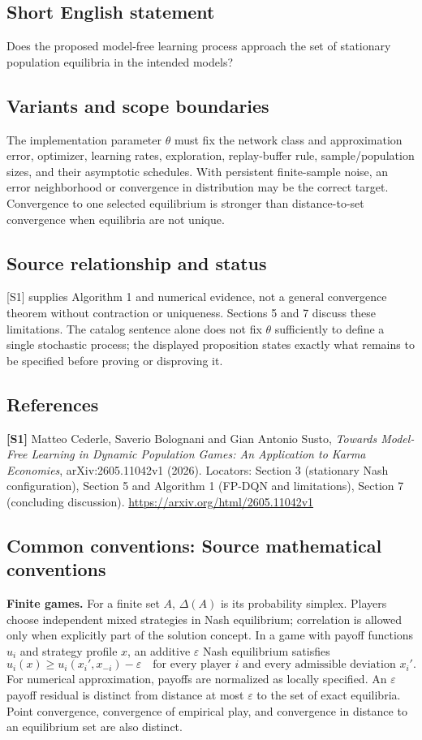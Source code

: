 \documentclass[11pt,a4paper]{article}
\begin{document}
\subsection*{Short English statement}
Does the proposed model-free learning process approach the set of stationary population equilibria in the intended models?
\subsection*{Variants and scope boundaries}
The implementation parameter $\theta$ must fix the network class and approximation error, optimizer, learning rates, exploration, replay-buffer rule, sample/population sizes, and their asymptotic schedules. With persistent finite-sample noise, an error neighborhood or convergence in distribution may be the correct target. Convergence to one selected equilibrium is stronger than distance-to-set convergence when equilibria are not unique.
\subsection*{Source relationship and status}
[S1] supplies Algorithm 1 and numerical evidence, not a general convergence theorem without contraction or uniqueness. Sections 5 and 7 discuss these limitations. The catalog sentence alone does not fix $\theta$ sufficiently to define a single stochastic process; the displayed proposition states exactly what remains to be specified before proving or disproving it.
\subsection*{References}
\begingroup\footnotesize\raggedright
\textbf{[S1]} Matteo Cederle, Saverio Bolognani and Gian Antonio Susto, \emph{Towards Model-Free Learning in Dynamic Population Games: An Application to Karma Economies}, arXiv:2605.11042v1 (2026). Locators: Section 3 (stationary Nash configuration), Section 5 and Algorithm 1 (FP-DQN and limitations), Section 7 (concluding discussion). \url{https://arxiv.org/html/2605.11042v1}
\par\endgroup

\subsection*{Common conventions: Source mathematical conventions}

\textbf{Finite games.} For a finite set $A$, $\Delta(A)$ is its probability
simplex. Players choose independent mixed strategies in Nash equilibrium;
correlation is allowed only when explicitly part of the solution concept.
In a game with payoff functions $u_i$ and strategy profile $x$, an additive
$\varepsilon$ Nash equilibrium satisfies
\[
 u_i(x)\geq u_i(x_i',x_{-i})-\varepsilon
 \quad\text{for every player $i$ and every admissible deviation $x_i'$}.
\]
For numerical approximation, payoffs are normalized as locally specified.
An $\varepsilon$ payoff residual is distinct from distance at most
$\varepsilon$ to the set of exact equilibria. Point convergence, convergence
of empirical play, and convergence in distance to an equilibrium set are
also distinct.
\end{document}
